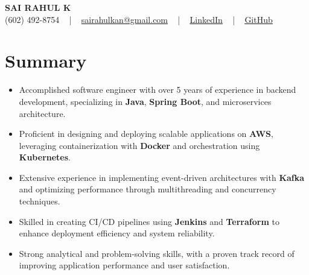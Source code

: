\documentclass[letterpaper,11pt]{article}
\newcommand{\resumeItem}[1]{
  \item\footnotesize{
    {#1 \vspace{-2pt}}
  }
}
\newcommand{\resumeItemListStart}{\begin{itemize}[leftmargin=*]}
\newcommand{\resumeItemListEnd}{\end{itemize}\vspace{-5pt}}
\begin{document}
\begin{center}
    {\fontsize{14pt}{12pt}\selectfont \textbf{\MakeUppercase{Sai Rahul K}}}\\ \vspace{2pt}
    \fontsize{10pt}{12pt}\selectfont (602) 492-8754 ~ | ~ \href{mailto:sairahulkan@gmail.com}{sairahulkan@gmail.com} ~ | ~
    \href{https://www.linkedin.com/in/rq123/}{\color{blue}\underline{LinkedIn}} ~ | ~
    \href{https://github.com/kanrahuldo}{\color{blue}\underline{GitHub}}~
    \vspace{-8pt}
\end{center}

\section{Summary}
\fontsize{9pt}{10pt}\selectfont
\resumeItemListStart
    \resumeItem{Accomplished software engineer with over 5 years of experience in backend development, specializing in \textbf{Java}, \textbf{Spring Boot}, and microservices architecture.} \vspace{-3pt}
    \resumeItem{Proficient in designing and deploying scalable applications on \textbf{AWS}, leveraging containerization with \textbf{Docker} and orchestration using \textbf{Kubernetes}.} \vspace{-3pt}
    \resumeItem{Extensive experience in implementing event-driven architectures with \textbf{Kafka} and optimizing performance through multithreading and concurrency techniques.} \vspace{-3pt}
    \resumeItem{Skilled in creating CI/CD pipelines using \textbf{Jenkins} and \textbf{Terraform} to enhance deployment efficiency and system reliability.} \vspace{-3pt}
    \resumeItem{Strong analytical and problem-solving skills, with a proven track record of improving application performance and user satisfaction.} \vspace{-3pt}
\resumeItemListEnd
\vspace{-6pt}
\end{document}
